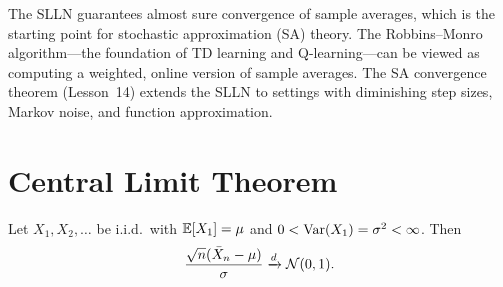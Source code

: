 \documentclass[11pt,a4paper]{article}
\begin{document}
\begin{rlconnection}[title={SLLN and Stochastic Approximation}]
The SLLN guarantees almost sure convergence of sample averages,
which is the starting point for stochastic approximation (SA)
theory.  The Robbins--Monro algorithm---the foundation of TD
learning and Q-learning---can be viewed as computing a weighted,
online version of sample averages.  The SA convergence theorem
(Lesson~14) extends the SLLN to settings with diminishing step
sizes, Markov noise, and function approximation.
\end{rlconnection}


\section{Central Limit Theorem}
\label{sec:clt}

\begin{keyresult}[title={Central Limit Theorem}]
\begin{theorem}
\label{thm:clt}
Let $X_1, X_2, \ldots$ be i.i.d.\ with $\mathbb{E}[X_1] = \mu$ and
$0 < \operatorname{Var}(X_1) = \sigma^2 < \infty$.  Then
\begin{equation}
  \frac{\sqrt{n}(\bar{X}_n - \mu)}{\sigma} \xrightarrow{d}
  \mathcal{N}(0, 1).
  \label{eq:clt}
\end{equation}
\end{theorem}
\end{keyresult}
\end{document}

